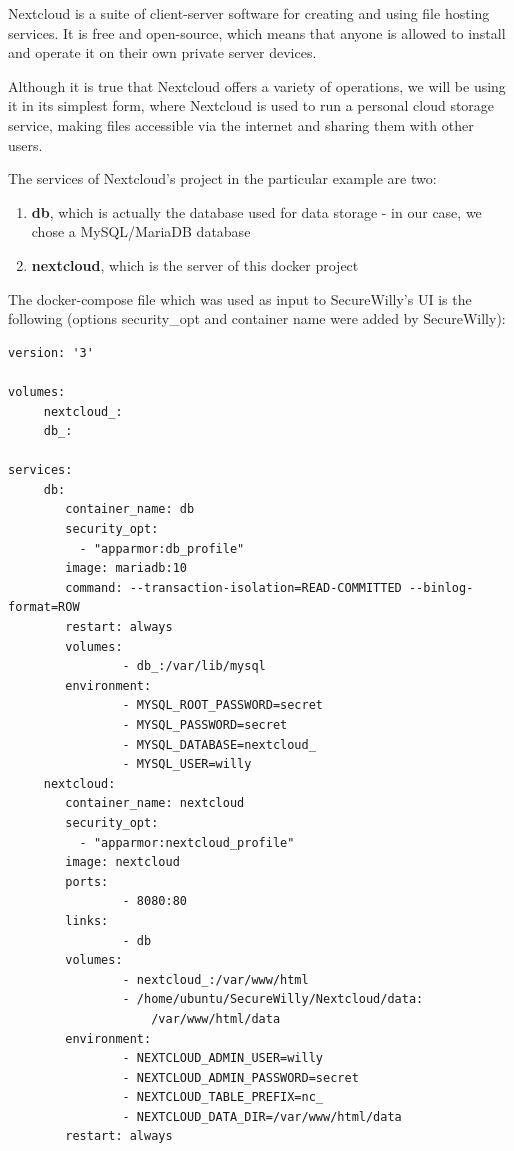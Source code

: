 Nextcloud is a suite of client-server software for creating and using file hosting services. It is free and open-source, which means that anyone is allowed to install and operate it on their own private server devices. \cite{wikinext}

Although it is true that Nextcloud offers a variety of operations, we will be using it in its simplest form, where Nextcloud is used to run a personal cloud storage service, making files accessible via the internet and sharing them with other users.

The services of Nextcloud's project in the particular example are two:
\begin{enumerate}
\item \textbf{db}, which is actually the database used for data storage - in our case, we chose a MySQL/MariaDB database
\item \textbf{nextcloud}, which is the server of this docker project
\end{enumerate}

The docker-compose file which was used as input to SecureWilly's UI is the following (options security\_opt and container name were added by SecureWilly):

\begin{lstlisting}[style=Dockerfile, caption={Nextcloud's docker-compose.yml}]
version: '3'

volumes:
     nextcloud_:
     db_:

services:
     db:
        container_name: db
        security_opt:
          - "apparmor:db_profile"
        image: mariadb:10
        command: --transaction-isolation=READ-COMMITTED --binlog-format=ROW
        restart: always
        volumes:
                - db_:/var/lib/mysql
        environment:
                - MYSQL_ROOT_PASSWORD=secret
                - MYSQL_PASSWORD=secret
                - MYSQL_DATABASE=nextcloud_
                - MYSQL_USER=willy
     nextcloud:
        container_name: nextcloud
        security_opt:
          - "apparmor:nextcloud_profile"
        image: nextcloud
        ports:
                - 8080:80
        links:
                - db
        volumes:
                - nextcloud_:/var/www/html
                - /home/ubuntu/SecureWilly/Nextcloud/data:
					/var/www/html/data
        environment:
                - NEXTCLOUD_ADMIN_USER=willy
                - NEXTCLOUD_ADMIN_PASSWORD=secret
                - NEXTCLOUD_TABLE_PREFIX=nc_
                - NEXTCLOUD_DATA_DIR=/var/www/html/data
        restart: always
\end{lstlisting}

